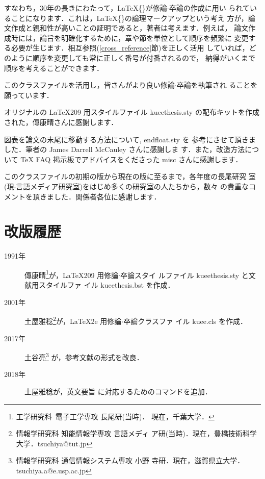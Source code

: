 \documentclass[
  sotsuron]{kuee}
\begin{document}
すなわち，30年の長きにわたって，\LaTeX\{\}が修論\(\cdot\)卒論の作成に用い
られていることになります．これは，\LaTeX\{\}の論理マークアップという考え
方が，論文作成と親和性が高いことの証明であると，著者は考えます．例えば，
論文作成時には，論旨を明確化するために，章や節を単位として順序を頻繁に
変更する必要が生じます．相互参照(\ref{cross_reference}節)を正しく活用
していれば，どのように順序を変更しても常に正しく番号が付番されるので，
納得がいくまで順序を考えることができます．

このクラスファイルを活用し，皆さんがより良い修論\(\cdot\)卒論を執筆され
ることを願っています．

\begin{acknowledgements}
  オリジナルの \LaTeX{}209 用スタイルファイル kueethesis.sty の配布キットを作成された，傳康晴さんに感謝します．


  図表を論文の末尾に移動する方法について, endfloat.sty を
  参考にさせて頂きました．筆者の James Darrell McCauley さんに感謝しま
  す．また，改造方法について \TeX{} FAQ 掲示板でアドバイスをくださった
  misc さんに感謝します．

  このクラスファイルの初期の版から現在の版に至るまで，各年度の長尾研究
  室(現$\cdot$言語メディア研究室)をはじめ多くの研究室の人たちから，数々
  の貴重なコメントを頂きました．関係者各位に感謝します．
\end{acknowledgements}




\appendix
\chapter{改版履歴}\label{chap:history}
\begin{description}
  \item[1991年] 傳康晴\footnote{工学研究科\ 電子工学専攻 長尾研(当時)．
          現在，千葉大学．}が，\LaTeX{}209 用修論$\cdot$卒論スタイ
        ルファイル kueethesis.sty と文献用スタイルファ
        イル kueethesis.bst を作成\cite{OldTebiki}．
  \item[2001年] 土屋雅稔\footnote{情報学研究科 知能情報学専攻 言語メディ
        ア研(当時)．現在，豊橋技術科学大学．tsuchiya@tut.jp}が，\LaTeX2e{} 用修論$\cdot$卒論クラスファ
        イル kuee.cls を作成\cite{Tebiki2004}．
        \setcounter{tsuaffil}{\value{footnote}}
  \item[2017年] 土谷亮\footnote{情報学研究科 通信情報システム専攻 小野
        寺研．現在，滋賀県立大学．tsuchiya.a@e.usp.ac.jp} が，参考文献の形式を改良．
  \item[2018年] 土屋雅稔\footnotemark[\value{tsuaffil}]{}が，英文要旨
        に対応するためのコマンドを追加．
\end{description}
\end{document}
